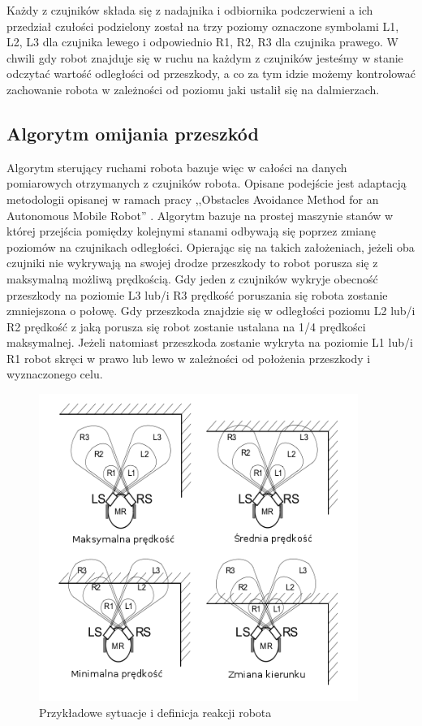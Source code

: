 Każdy z czujników składa się z nadajnika i odbiornika podczerwieni a ich
przedział czułości podzielony został na trzy poziomy oznaczone symbolami L1, L2,
L3 dla czujnika lewego i odpowiednio R1, R2, R3 dla czujnika prawego. W chwili
gdy robot znajduje się w ruchu na każdym z czujników jesteśmy w stanie odczytać
wartość odległości od przeszkody, a co za tym idzie możemy kontrolować zachowanie
robota w zależności od poziomu jaki ustalił się na dalmierzach.

\subsection{Algorytm omijania przeszkód}
Algorytm sterujący ruchami robota bazuje więc w całości na danych pomiarowych
otrzymanych z czujników robota. Opisane podejście jest adaptacją metodologii
opisanej w ramach pracy ,,Obstacles Avoidance Method for an Autonomous Mobile
Robot'' \cite{ObstaclesAvoidanceIR}. Algorytm bazuje na prostej maszynie stanów
w której przejścia pomiędzy kolejnymi stanami odbywają się poprzez zmianę poziomów na
czujnikach odległości. Opierając się na takich założeniach, jeżeli oba czujniki
nie wykrywają na swojej drodze przeszkody to robot porusza się z maksymalną
możliwą prędkością. Gdy jeden z czujników wykryje obecność przeszkody na poziomie
 L3 lub/i R3 prędkość poruszania się robota zostanie zmniejszona o połowę. Gdy
 przeszkoda znajdzie się w odległości poziomu L2 lub/i R2 prędkość z
jaką porusza się robot zostanie ustalana na 1/4 prędkości maksymalnej. Jeżeli
natomiast przeszkoda zostanie wykryta na poziomie L1 lub/i R1 robot skręci w
prawo lub lewo w zależności od położenia przeszkody i wyznaczonego celu.

\begin{figure}[hb]
 \centering
 \includegraphics[height=100mm]{../images/ch04/obs_avoid_algorithm.png}
 \caption{Przykładowe sytuacje i definicja reakcji robota}
 \label{fig:IRSensorPosition}
\end{figure}

